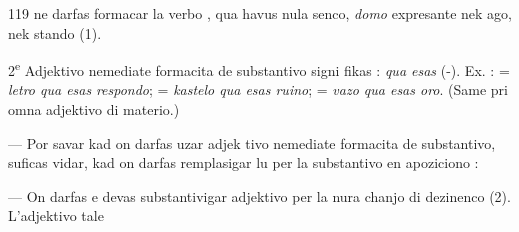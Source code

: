 \begin{VUpage}[123]{119}
\VUcontinue
ne darfas formacar la verbo , qua havus nula senco,\nl
\textit{domo} expresante nek ago, nek stando (1).

2\textsuperscript{e} Adjektivo nemediate formacita de substantivo signi\cc
fikas : \textit{qua esas} (-). Ex. :  = \textit{letro qua esas}\nl
\textit{respondo};  = \textit{kastelo qua esas ruino}; \nl
= \textit{vazo qua esas oro}. (Same pri omna adjektivo di materio.)\parplein

 --- Por savar kad on darfas uzar adjek\cc
tivo nemediate formacita de substantivo, suficas vidar, kad\nl
on darfas remplasigar lu per la substantivo en apoziciono :\nl
{}

 --- On darfas e devas substantivigar adjektivo\nl
per la nura chanjo di dezinenco (2). L'adjektivo tale\parplein
\end{VUpage}

